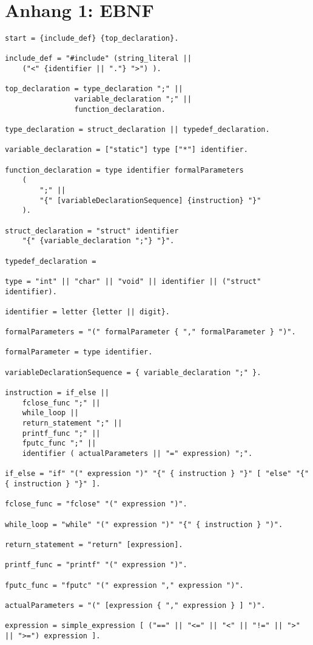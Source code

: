 \documentclass[a4paper]{article}
\begin{document}
	\newpage
	\section{Anhang 1: EBNF}
	\begin{lstlisting}
start = {include_def} {top_declaration}.

include_def = "#include" (string_literal ||
	("<" {identifier || "."} ">") ).

top_declaration = type_declaration ";" ||
				variable_declaration ";" ||
				function_declaration.

type_declaration = struct_declaration || typedef_declaration.

variable_declaration = ["static"] type ["*"] identifier.

function_declaration = type identifier formalParameters
	(
		";" ||
		"{" [variableDeclarationSequence] {instruction} "}"
	).

struct_declaration = "struct" identifier
	"{" {variable_declaration ";"} "}".

typedef_declaration =

type = "int" || "char" || "void" || identifier || ("struct" identifier).

identifier = letter {letter || digit}.

formalParameters = "(" formalParameter { "," formalParameter } ")".

formalParameter = type identifier.

variableDeclarationSequence = { variable_declaration ";" }.

instruction = if_else ||
	fclose_func ";" ||
	while_loop ||
	return_statement ";" ||
	printf_func ";" ||
	fputc_func ";" ||
	identifier ( actualParameters || "=" expression) ";".

if_else = "if" "(" expression ")" "{" { instruction } "}" [ "else" "{" { instruction } "}" ].

fclose_func = "fclose" "(" expression ")".

while_loop = "while" "(" expression ")" "{" { instruction } ")".

return_statement = "return" [expression].

printf_func = "printf" "(" expression ")".

fputc_func = "fputc" "(" expression "," expression ")".

actualParameters = "(" [expression { "," expression } ] ")".

expression = simple_expression [ ("==" || "<=" || "<" || "!=" || ">" || ">=") expression ].


\end{lstlisting}
\end{document}
